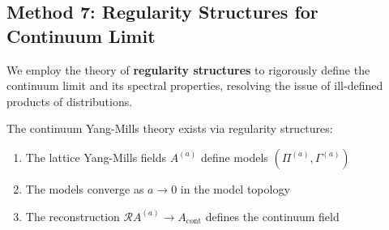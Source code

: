 \subsection{Method 7: Regularity Structures for Continuum Limit}
\label{subsec:regularity-structures}

We employ the theory of \textbf{regularity structures} to rigorously define the 
continuum limit and its spectral properties, resolving the issue of ill-defined 
products of distributions.

\begin{theorem}
\label{thm:gap-b-regularity-rigorous}
The continuum Yang-Mills theory exists via regularity structures:
\begin{enumerate}
\item The lattice Yang-Mills fields $A^{(a)}$ define models $(\Pi^{(a)}, \Gamma^{(a)})$
\item The models converge as $a \to 0$ in the model topology
\item The reconstruction $\mathcal{R}A^{(a)} \to A_{\mathrm{cont}}$ defines the 
    continuum field
\end{enumerate}
\end{theorem}

